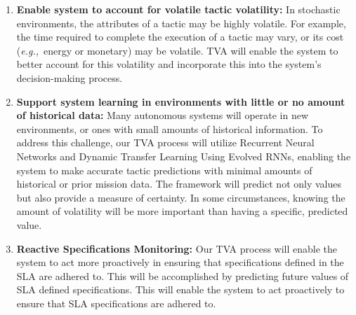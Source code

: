 \documentclass{article}
\newcommand{\eg}{\emph{e.g.,}\xspace}
\newcommand{\descStep}[2]{\noindent \textbf{#1: } #2}
\begin{document}
\begin{enumerate}[noitemsep]

    \item \descStep{Enable system to account for volatile tactic volatility}{In stochastic environments, the attributes of a tactic may be highly volatile. For example, the time required to complete the execution of a tactic may vary, or its cost (\eg ~energy or monetary) may be volatile. TVA will enable the system to better account for this volatility and incorporate this into the system's decision-making process.} %
    
    
    
    
    

	\item \descStep{Support system learning in environments with little or no amount of historical data}{Many autonomous systems will operate in new environments, or ones with small amounts of historical information. To address this challenge, our TVA process will utilize Recurrent Neural Networks and Dynamic Transfer Learning Using Evolved RNNs, enabling the system to make accurate tactic predictions with minimal amounts of historical or prior mission data. The framework will predict not only values but also provide a measure of certainty. In some circumstances, knowing the amount of volatility will be more important than having a specific, predicted value.}  
	
   \item \descStep{Reactive Specifications Monitoring}{Our TVA process will enable the system to act more proactively in ensuring that specifications defined in the SLA are adhered to. This will be accomplished by predicting future values of SLA defined specifications. This will enable the system to act proactively to ensure that SLA specifications are adhered to.}  


    

\end{enumerate}
\end{document}
